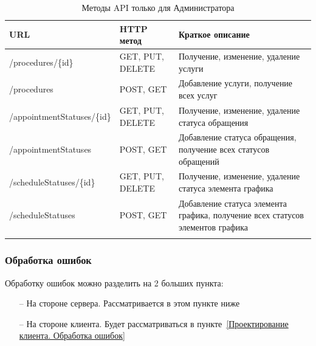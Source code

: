 \documentclass[a4paper,article]{article}
\begin{document}
\begin{sloppypar}
    \newpage

    \begin{xltabular}{\textwidth} { |
        >{\hsize} X |
        >{\hsize} X |
        >{\hsize} X | }

        \hline
        URL
        & HTTP метод
        & Краткое описание \\

        \hline
        /procedures/\{id\}
        & GET, PUT, DELETE
        & Получение, изменение, удаление услуги \\

        \hline
        /procedures
        & POST, GET
        & Добавление услуги, получение всех услуг \\

        \hline
        /appointmentStatuses/\{id\}
        & GET, PUT, DELETE
        & Получение, изменение, удаление статуса обращения \\

        \hline
        /appointmentStatuses
        & POST, GET
        & Добавление статуса обращения, получение всех статусов обращений \\

        \hline
        /scheduleStatuses/\{id\}
        & GET, PUT, DELETE
        & Получение, изменение, удаление статуса элемента графика \\

        \hline
        /scheduleStatuses
        & POST, GET
        & Добавление статуса элемента графика, получение всех статусов элементов графика \\

        \hline

        \caption{\centering Методы API только для Администратора}

        \label{tab:Методы API только для Администатора}
    \end{xltabular}

    \subsubsection{Обработка ошибок}\label{Проектирование сервера. Обработка ошибок}

    Обработку ошибок можно разделить на 2 больших пункта:

    \begin{itemize}[nolistsep]
        \item[--] На стороне сервера. Рассматривается в этом пункте ниже
        \item[--] На стороне клиента. Будет рассматриваться в пункте~\ref{Проектирование клиента. Обработка ошибок}
    \end{itemize}


\end{sloppypar}
\end{document}
